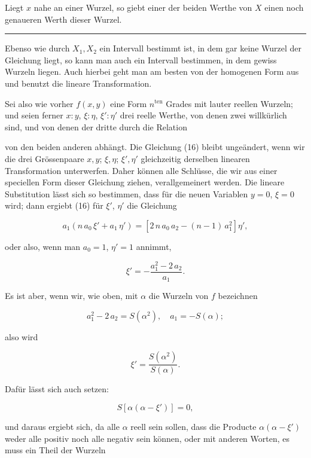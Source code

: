 
Liegt $x$ nahe an einer Wurzel, so giebt einer der beiden Werthe
von $X$ einen noch genaueren Werth dieser Wurzel.

\begin{center}
\rule{2cm}{0.4pt}
\end{center}

Ebenso wie durch $X_1, X_2$ ein Intervall bestimmt ist, in dem
gar keine Wurzel der Gleichung liegt, so kann man auch ein
Intervall bestimmen, in dem gewiss Wurzeln liegen. Auch hierbei
geht man am besten von der homogenen Form aus und benutzt
die lineare Transformation.

Sei also wie vorher $f(x, y)$ eine Form $n^{\text{ten}}$ Grades mit lauter
reellen Wurzeln; und seien ferner $x:y$, $\xi:\eta$, $\xi':\eta'$ drei reelle
Werthe, von denen zwei willkürlich sind, und von denen der
dritte durch die Relation


von den beiden anderen abhängt. Die Gleichung (16) bleibt
ungeändert, wenn wir die drei Grössenpaare $x, y$; $\xi, \eta$; $\xi', \eta'$
gleichzeitig derselben linearen Transformation unterwerfen. Daher
können alle Schlüsse, die wir aus einer speciellen Form dieser
Gleichung ziehen, verallgemeinert werden. Die lineare Substitution
lässt sich so bestimmen, dass für die neuen Variablen $y = 0$,
$\xi = 0$ wird; dann ergiebt (16) für $\xi'$, $\eta'$ die Gleichung

\[
a_1(n\,a_0\,\xi' + a_1\,\eta') = [2\,n\,a_0\,a_2 - (n-1)\,a_1^2]\eta',
\]

oder also, wenn man $a_0 = 1$, $\eta' = 1$ annimmt,

\[
\xi' = -\frac{a_1^2 - 2\,a_2}{a_1}.
\]

Es ist aber, wenn wir, wie oben, mit $\alpha$ die Wurzeln von $f$
bezeichnen

\[
a_1^2 - 2\,a_2 = S(\alpha^2), \quad a_1 = -S(\alpha);
\]

also wird

\[
\xi' = \frac{S(\alpha^2)}{S(\alpha)}.
\]

Dafür lässt sich auch setzen:

\[
S[\alpha(\alpha - \xi')] = 0,
\]

und daraus ergiebt sich, da alle $\alpha$ reell sein sollen, dass die
Producte $\alpha(\alpha - \xi')$ weder alle positiv noch alle negativ sein
können, oder mit anderen Worten, es muss ein Theil der Wurzeln
